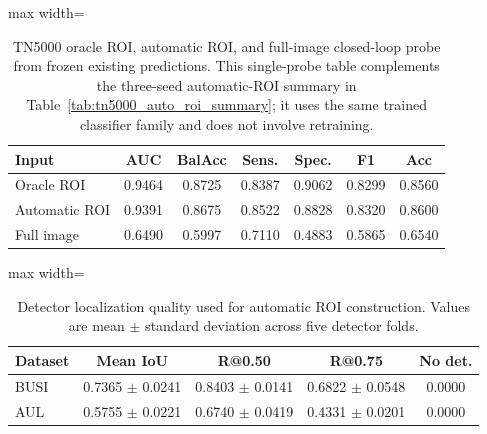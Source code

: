 \begin{table}[t]
    \centering
    \small
    \caption{TN5000 oracle ROI, automatic ROI, and full-image closed-loop probe from frozen existing predictions. This single-probe table complements the three-seed automatic-ROI summary in Table~\ref{tab:tn5000_auto_roi_summary}; it uses the same trained classifier family and does not involve retraining.}
    \label{tab:tn5000_oracle_auto_full_probe}
    \begin{adjustbox}{max width=\columnwidth}
    \begin{tabular}{lcccccc}
        \toprule
        Input & AUC & BalAcc & Sens. & Spec. & F1 & Acc \\
        \midrule
        Oracle ROI & 0.9464 & 0.8725 & 0.8387 & 0.9062 & 0.8299 & 0.8560 \\
        Automatic ROI & 0.9391 & 0.8675 & 0.8522 & 0.8828 & 0.8320 & 0.8600 \\
        Full image & 0.6490 & 0.5997 & 0.7110 & 0.4883 & 0.5865 & 0.6540 \\
        \bottomrule
    \end{tabular}
    \end{adjustbox}
\end{table}

\begin{table}[t]
    \centering
    \small
    \caption{Detector localization quality used for automatic ROI construction. Values are mean $\pm$ standard deviation across five detector folds.}
    \label{tab:auto_roi_detector_quality}
    \begin{adjustbox}{max width=\columnwidth}
    \begin{tabular}{lcccc}
        \toprule
        Dataset & Mean IoU & R@0.50 & R@0.75 & No det. \\
        \midrule
        BUSI & 0.7365 $\pm$ 0.0241 & 0.8403 $\pm$ 0.0141 & 0.6822 $\pm$ 0.0548 & 0.0000 \\
        AUL & 0.5755 $\pm$ 0.0221 & 0.6740 $\pm$ 0.0419 & 0.4331 $\pm$ 0.0201 & 0.0000 \\
        \bottomrule
    \end{tabular}
    \end{adjustbox}
\end{table}

